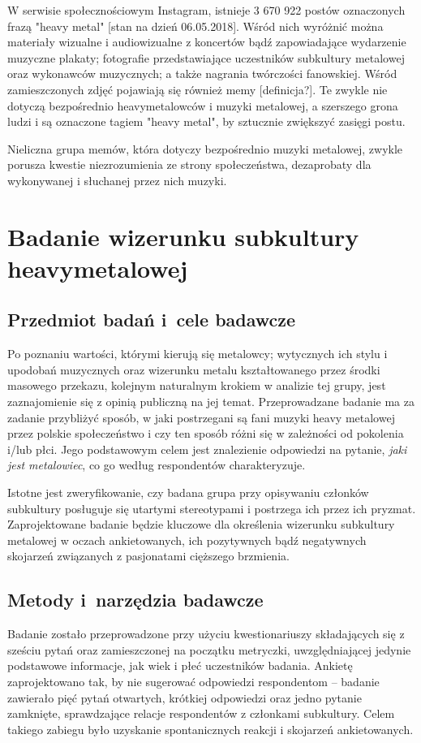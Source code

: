 \documentclass[12pt, a4paper, titlepage]{report}
\begin{document}
W serwisie społecznościowym Instagram, istnieje 3 670 922 postów oznaczonych frazą "heavy metal" [stan na dzień 06.05.2018]. Wśród nich wyróżnić można materiały wizualne i audiowizualne z koncertów bądź zapowiadające wydarzenie muzyczne plakaty; fotografie przedstawiające uczestników subkultury metalowej oraz wykonawców muzycznych; a także nagrania twórczości fanowskiej. Wśród zamieszczonych zdjęć pojawiają się również memy [definicja?]. Te zwykle nie dotyczą bezpośrednio heavymetalowców i muzyki metalowej, a szerszego grona ludzi i są oznaczone tagiem "heavy metal", by sztucznie zwiększyć zasięgi postu. 

Nieliczna grupa memów, która dotyczy bezpośrednio muzyki metalowej, zwykle porusza kwestie niezrozumienia ze strony społeczeństwa, dezaprobaty dla wykonywanej i słuchanej przez nich muzyki. 

\chapter{Badanie wizerunku subkultury heavymetalowej}
\section{Przedmiot badań i~cele badawcze}
Po poznaniu wartości, którymi kierują się metalowcy; wytycznych ich stylu i upodobań muzycznych oraz wizerunku metalu kształtowanego przez środki masowego przekazu, kolejnym naturalnym krokiem w analizie tej grupy, jest zaznajomienie się z opinią publiczną na jej temat. Przeprowadzane badanie ma za zadanie przybliżyć sposób, w jaki postrzegani są fani muzyki heavy metalowej przez polskie społeczeństwo i czy ten sposób różni się w zależności od pokolenia i/lub płci. Jego podstawowym celem jest znalezienie odpowiedzi na pytanie, \emph{jaki jest metalowiec}, co go według respondentów charakteryzuje. 

Istotne jest zweryfikowanie, czy badana grupa przy opisywaniu członków subkultury posługuje się utartymi stereotypami i postrzega ich przez ich pryzmat. Zaprojektowane badanie będzie kluczowe dla określenia wizerunku subkultury metalowej w oczach ankietowanych, ich pozytywnych bądź negatywnych skojarzeń związanych z pasjonatami cięższego brzmienia. 

\section{Metody i~narzędzia badawcze}
Badanie zostało przeprowadzone przy użyciu kwestionariuszy składających się z sześciu pytań oraz zamieszczonej na początku metryczki, uwzględniającej jedynie podstawowe informacje, jak wiek i płeć uczestników badania. Ankietę zaprojektowano tak, by nie sugerować odpowiedzi respondentom -- badanie zawierało pięć pytań otwartych, krótkiej odpowiedzi oraz jedno pytanie zamknięte, sprawdzające relacje respondentów z członkami subkultury. Celem takiego zabiegu było uzyskanie spontanicznych reakcji i skojarzeń ankietowanych. 
\end{document}
